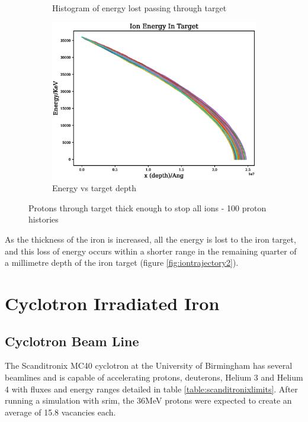\begin{figure}[htb]
\begin{subfigure}{0.49\textwidth}
  \caption{Histogram of energy lost passing through target}
  \label{fig:energylost2}
\end{subfigure}
\begin{subfigure}{0.49\textwidth}
  \includegraphics[width=\linewidth]{chapters/activity_code/images/energy_depth_full.eps}
  \caption{Energy vs target depth}
  \label{fig:fe36mevenergydepthfull}
\end{subfigure}
\caption{Protons through target thick enough to stop all ions - 100 proton histories}
\label{fig:xsdata-particle2}
\end{figure}

As the thickness of the iron is increased, all the energy is lost to the iron target, and this loss of energy occurs within a shorter range in the remaining quarter of a millimetre depth of the iron target (figure \ref{fig:iontrajectory2}).










\section{Cyclotron Irradiated Iron}

\subsection{Cyclotron Beam Line}

The Scanditronix MC40 cyclotron at the University of Birmingham has several beamlines and is capable of accelerating protons, deuterons, Helium 3 and Helium 4 with fluxes and energy ranges detailed in table \ref{table:scanditronixlimits}.  After running a simulation with \acrshort{srim}, the 36MeV protons were expected to create an average of 15.8 vacancies each.

